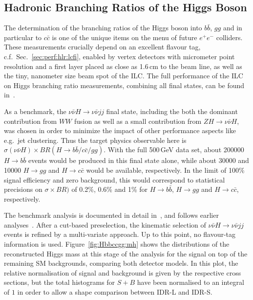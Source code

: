 \subsection{Hadronic Branching Ratios of the Higgs Boson}

The determination of the branching ratios of the Higgs boson into $b\bar{b}$, $gg$ and in particular to $c\bar{c}$ is one of the unique items
on the menu of future $e^+e^-$ colliders. These measurements crucially depend on 
an excellent flavour tag, c.f.\ Sec.~\ref{sec:perf:hlr:lcfi}, enabled
by vertex detectors with micrometer point resolution and a first layer placed as close as 1.6\,cm to the beam line, as well as the tiny, nanometer size beam spot of the ILC. The full performance of the ILC on Higgs branching ratio measurements, combining all final states,  can be found in~\cite{Bambade:2019fyw}.

As a benchmark, the $\nu \bar{\nu} H \to \nu \bar{\nu} jj$ final state, including the both the dominant contribution from $WW$ fusion as well as a small contribution from $ZH\to\nu\bar{\nu} H$, was chosen in order to minimize the impact of other performance aspects like e.g.\ jet clustering. Thus the target physics observable here is $\sigma(\nu\bar{\nu} H)\times BR(H\to b\bar{b} / c\bar{c} / gg)$. With the full 500\,GeV data set, about 200000 $H \to b\bar{b}$ events would be produced in this final state alone, while about 30000 and 10000 $H \to gg$ and $H \to c\bar{c}$ would be available, respectively. In the 
limit of 100\% signal efficiency and zero background, this would correspond to statistical precisions on $\sigma \times BR)$ of 0.2\%, 0.6\% and 1\% for $H \to b\bar{b}$, $H \to gg$ and $H \to c\bar{c}$, respectively.

The benchmark analysis is documented in detail in~\cite{ILDNote:Hbbccgg}, and follows earlier analyses~\cite{Mueller:2016exq,Ono:2013voc,Ono:2013sea}.  After a cut-based preselection, the kinematic selection of $\nu \bar{\nu} H \to \nu \bar{\nu} jj$ events is refined by a multi-variate approach. Up to this point, no flavour-tag information is used.
Figure~\ref{fig:Hbbccgg:mh} shows the distributions of the reconstructed Higgs mass at this stage of the analysis for the signal on top of the remaining SM backgrounds, comparing both detector models. In this plot, the relative normalisation of signal and background is given by the respective cross sections, but the total histograms for $S+B$ have been normalised to an integral of $1$ in order to allow a shape comparison between IDR-L and IDR-S.

